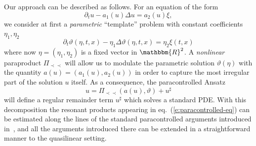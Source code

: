 \documentclass{amsart}
\newcommand{\precprec}{\prec\!\!\!\prec}
\newcommand{\tmtextit}[1]{{\itshape{#1}}}
\theoremstyle{remark}
\theoremstyle{definition}
\begin{document}
Our approach can be described as follows. For an equation of the form
\[ \partial_t u - a_1 (u) \Delta u = a_2 (u) \xi, \]
we consider at first a \tmtextit{parametric} ``template'' problem with
constant coefficients $\eta_1, \eta_2$
\begin{equation}
  \partial_t \vartheta (\eta, t, x) - \eta_1 \Delta \vartheta (\eta, t, x) =
  \eta_2 \xi (t, x) \label{eq:template}
\end{equation}
where now $\eta = (\eta_1, \eta_2)$ is a fixed vector in $\mathbbm{R}^2$. A
\tmtextit{nonlinear} paraproduct $\Pi_{\precprec}$ will allow us to modulate
the parametric solution $\vartheta (\eta)$ with the quantity $a (u) = (a_1
(u), a_2 (u))$ in order to capture the most irregular part of the solution $u$
itself. As a consequence, the paracontrolled Ansatz
\[ u = \Pi_{\precprec} (a (u), \vartheta) + u^{\sharp} \]
will define a regular remainder term $u^{\sharp}$ which solves a standard PDE.
With this decomposition the resonant products appearing in
eq.~(\ref{e:paracontrolled-eq}) can be estimated along the lines of the
standard paracontrolled arguments introduced
in~{\cite{gubinelli_paracontrolled_2015}}, and all the arguments introduced
there can be extended in a straightforward manner to the quasilinear setting.

\
\end{document}
